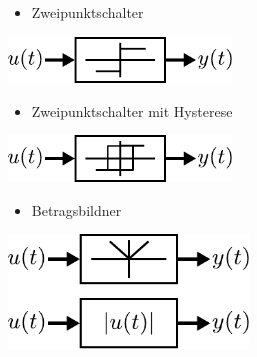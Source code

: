 \begin{figure}[h]
\begin{subfigure}[c]{\textwidth}
		\begin{minipage}{0.5\textwidth}
			\begin{itemize}
				\item Zweipunktschalter 
			\end{itemize}
		\end{minipage}
		\begin{minipage}{0.5\textwidth}
			\centering
			\includegraphics[width=0.65\textwidth]{Abbildungen/Modellbildung/PDF/Zweipunktschalter.pdf}
		\end{minipage}
	\end{subfigure} 
	\vspace{1cm}
	\begin{subfigure}[c]{\textwidth}
		\begin{minipage}{0.5\textwidth}
			\begin{itemize}
				\item Zweipunktschalter mit Hysterese
			\end{itemize}
		\end{minipage}\hfill
		\begin{minipage}{0.5\textwidth}
			\centering
			\includegraphics[width=0.65\textwidth]{Abbildungen/Modellbildung/PDF/ZweipunktschalterHyst.pdf}
		\end{minipage}
	\end{subfigure} 
	\vspace{1cm}
	\begin{subfigure}[c]{\textwidth}
		\begin{minipage}{0.5\textwidth}
			\begin{itemize}
				\item Betragsbildner
			\end{itemize}
		\end{minipage}\hfill
		\begin{minipage}{0.5\textwidth}
			\centering
			\includegraphics[width=0.7\textwidth]{Abbildungen/Modellbildung/PDF/Betragsglied.pdf}

\end{minipage}
\end{subfigure}
\end{figure}
